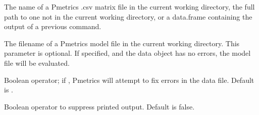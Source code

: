 \documentclass[a4paper]{book}
\begin{document}
%
\begin{Arguments}
\begin{ldescription}
\item[\code{data}] The name of a Pmetrics .csv matrix file in the current working directory,
the full path to one not in the current working directory, or a data.frame containing 
the output of a previous  command.

\item[\code{model}] The filename of a Pmetrics model file in the current working directory.  This parameter is optional.
If specified, and the data object has no errors, the model file will be evaluated.

\item[\code{fix}] Boolean operator; if , Pmetrics will attempt to fix errors in the data file.
Default is .

\item[\code{quiet}] Boolean operator to suppress printed output.  Default is false.
\end{ldescription}
\end{Arguments}
%
\end{document}

